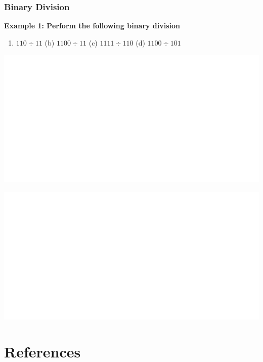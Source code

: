 \documentclass[]{book}
\providecommand{\tightlist}{%
  \setlength{\itemsep}{0pt}\setlength{\parskip}{0pt}}
\begin{document}
\hypertarget{binary-division}{%
\subsubsection{Binary Division}\label{binary-division}}

\textbf{Example 1: Perform the following binary division}

\begin{enumerate}
\def\labelenumi{(\alph{enumi})}
\tightlist
\item
  \(110\div11\) (b) \(1100\div11\) (c) \(1111\div110\) (d) \(1100\div101\)
\end{enumerate}

\begin{center}\includegraphics[width=1\linewidth]{figure/NSbox27-1} \end{center}

\begin{center}\includegraphics[width=1\linewidth]{figure/NSbox28-1} \end{center}

\hypertarget{references}{%
\section*{References}\label{references}}
\end{document}
